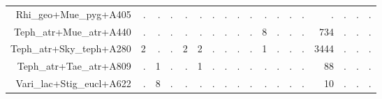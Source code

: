\documentclass[a4paper, 11]{article}\usepackage[]{graphicx}\usepackage[]{color}
\begin{document}
\begin{table}
\begin{tabular}{rrrrrrrrrrrrrrrrrr}
  Rhi\_geo+Mue\_pyg+A405 & . & . & . & . & . & . & . & . & . & . & . & . & . & . & . & . & . \\ 
  Teph\_atr+Mue\_atr+A440 & . & . & . & . & . & . & . & . & . & 8 & . & . & . & 734 & . & . & . \\ 
  Teph\_atr+Sky\_teph+A280 & 2 & . & . & 2 & 2 & . & . & . & . & 1 & . & . & . & 3444 & . & . & . \\ 
  Teph\_atr+Tae\_atr+A809 & . & 1 & . & . & 1 & . & . & . & . & . & . & . & . & 88 & . & . & . \\ 
  Vari\_lac+Stig\_eucl+A622 & . & 8 & . & . & . & . & . & . & . & . & . & . & . & 10 & . & . & . \\ 
   \hline
\end{tabular}
\end{table}
\end{document}
